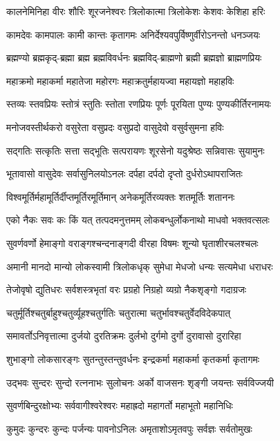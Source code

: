 \twolineshloka
{कालनेमिनिहा वीरः शौरिः शूरजनेश्वरः}
{त्रिलोकात्मा त्रिलोकेशः केशवः केशिहा हरिः}

\twolineshloka
{कामदेवः कामपालः कामी कान्तः कृतागमः}
{अनिर्देश्यवपुर्विष्णुर्वीरोऽनन्तो धनञ्जयः}

\twolineshloka
{ब्रह्मण्यो ब्रह्मकृद्-ब्रह्मा ब्रह्म ब्रह्मविवर्धनः}
{ब्रह्मविद्-ब्राह्मणो ब्रह्मी ब्रह्मज्ञो ब्राह्मणप्रियः}

\twolineshloka
{महाक्रमो महाकर्मा महातेजा महोरगः}
{महाक्रतुर्महायज्वा महायज्ञो महाहविः}

\twolineshloka
{स्तव्यः स्तवप्रियः स्तोत्रं स्तुतिः स्तोता रणप्रियः}
{पूर्णः पूरयिता पुण्यः पुण्यकीर्तिरनामयः}

\twolineshloka
{मनोजवस्तीर्थकरो वसुरेता वसुप्रदः}
{वसुप्रदो वासुदेवो वसुर्वसुमना हविः}

\twolineshloka
{सद्गतिः सत्कृतिः सत्ता सद्भूतिः सत्परायणः}
{शूरसेनो यदुश्रेष्ठः सन्निवासः सुयामुनः}

\twolineshloka
{भूतावासो वासुदेवः सर्वासुनिलयोऽनलः}
{दर्पहा दर्पदो दृप्तो दुर्धरोऽथापराजितः}

\twolineshloka
{विश्वमूर्तिर्महामूर्तिर्दीप्तमूर्तिरमूर्तिमान्}
{अनेकमूर्तिरव्यक्तः शतमूर्तिः शताननः}

\twolineshloka
{एको नैकः सवः कः किं यत् तत्पदमनुत्तमम्}
{लोकबन्धुर्लोकनाथो माधवो भक्तवत्सलः}

\twolineshloka
{सुवर्णवर्णो हेमाङ्गो वराङ्गश्चन्दनाङ्गदी}
{वीरहा विषमः शून्यो घृताशीरचलश्चलः}

\twolineshloka
{अमानी मानदो मान्यो लोकस्वामी त्रिलोकधृक्}
{सुमेधा मेधजो धन्यः सत्यमेधा धराधरः}

\twolineshloka
{तेजोवृषो द्युतिधरः सर्वशस्त्रभृतां वरः}
{प्रग्रहो निग्रहो व्यग्रो नैकशृङ्गो गदाग्रजः}

\twolineshloka
{चतुर्मूर्तिश्चतुर्बाहुश्चतुर्व्यूहश्चतुर्गतिः}
{चतुरात्मा चतुर्भावश्चतुर्वेदविदेकपात्}

\twolineshloka
{समावर्तोऽनिवृत्तात्मा दुर्जयो दुरतिक्रमः}
{दुर्लभो दुर्गमो दुर्गो दुरावासो दुरारिहा}

\twolineshloka
{शुभाङ्गो लोकसारङ्गः सुतन्तुस्तन्तुवर्धनः}
{इन्द्रकर्मा महाकर्मा कृतकर्मा कृतागमः}

\twolineshloka
{उद्भवः सुन्दरः सुन्दो रत्ननाभः सुलोचनः}
{अर्को वाजसनः शृङ्गी जयन्तः सर्वविज्जयी}

\twolineshloka
{सुवर्णबिन्दुरक्षोभ्यः सर्ववागीश्वरेश्वरः}
{महाह्रदो महागर्तो महाभूतो महानिधिः}

\twolineshloka
{कुमुदः कुन्दरः कुन्दः पर्जन्यः पावनोऽनिलः}
{अमृताशोऽमृतवपुः सर्वज्ञः सर्वतोमुखः}

